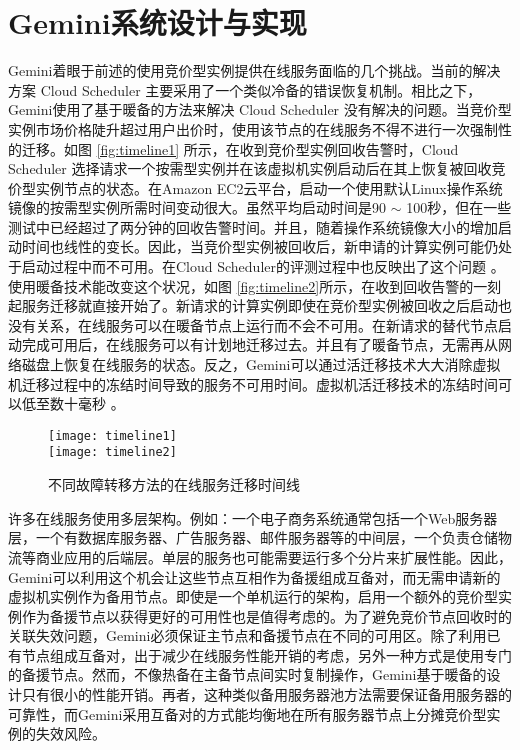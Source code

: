 \section{Gemini系统设计与实现}
\label{sec-gemini}
Gemini着眼于前述的使用竞价型实例提供在线服务面临的几个挑战。当前的解决方案 Cloud Scheduler \cite{He:2015:CCH:2749246.2749275} 主要采用了一个类似冷备的错误恢复机制。相比之下，Gemini使用了基于暖备的方法来解决 Cloud Scheduler 没有解决的问题。当竞价型实例市场价格陡升超过用户出价时，使用该节点的在线服务不得不进行一次强制性的迁移。如图 \ref{fig:timeline1} 所示，在收到竞价型实例回收告警时，Cloud Scheduler 选择请求一个按需型实例并在该虚拟机实例启动后在其上恢复被回收竞价型实例节点的状态。在Amazon EC2云平台，启动一个使用默认Linux操作系统镜像的按需型实例所需时间变动很大。虽然平均启动时间是90 $\sim$ 100秒，但在一些测试中已经超过了两分钟的回收告警时间。并且，随着操作系统镜像大小的增加启动时间也线性的变长。因此，当竞价型实例被回收后，新申请的计算实例可能仍处于启动过程中而不可用。在Cloud Scheduler的评测过程中也反映出了这个问题 \cite{He:2015:CCH:2749246.2749275}。使用暖备技术能改变这个状况，如图 \ref{fig:timeline2}所示，在收到回收告警的一刻起服务迁移就直接开始了。新请求的计算实例即使在竞价型实例被回收之后启动也没有关系，在线服务可以在暖备节点上运行而不会不可用。在新请求的替代节点启动完成可用后，在线服务可以有计划地迁移过去。并且有了暖备节点，无需再从网络磁盘上恢复在线服务的状态。反之，Gemini可以通过活迁移技术大大消除虚拟机迁移过程中的冻结时间导致的服务不可用时间。虚拟机活迁移技术的冻结时间可以低至数十毫秒 \cite{Clark:2005:LMV:1251203.1251223}。
\begin{figure}
  \centering%
    {\texttt{[image: timeline1]}}%
  \\
  \vspace{5em}%
      {\texttt{[image: timeline2]}}
  \vspace{5em}%
  \caption{不同故障转移方法的在线服务迁移时间线}
  \label{fig:timeline}
\end{figure}

许多在线服务使用多层架构。例如：一个电子商务系统通常包括一个Web服务器层，一个有数据库服务器、广告服务器、邮件服务器等的中间层，一个负责仓储物流等商业应用的后端层。单层的服务也可能需要运行多个分片来扩展性能。因此，Gemini可以利用这个机会让这些节点互相作为备援组成互备对，而无需申请新的虚拟机实例作为备用节点。即使是一个单机运行的架构，启用一个额外的竞价型实例作为备援节点以获得更好的可用性也是值得考虑的。为了避免竞价节点回收时的关联失效问题，Gemini必须保证主节点和备援节点在不同的可用区。除了利用已有节点组成互备对，出于减少在线服务性能开销的考虑，另外一种方式是使用专门的备援节点。然而，不像热备在主备节点间实时复制操作，Gemini基于暖备的设计只有很小的性能开销。再者，这种类似备用服务器池方法需要保证备用服务器的可靠性，而Gemini采用互备对的方式能均衡地在所有服务器节点上分摊竞价型实例的失效风险。

